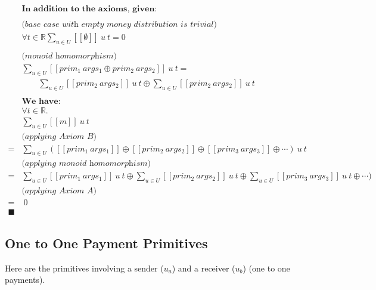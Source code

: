 \begin{equation}
    \begin{split}
        &\textbf{In addition to the axioms, given:} \\
        \\
        &\textit{(base case with empty money distribution is trivial)} \\
        &\forall t \in \mathbb{R} {\displaystyle \sum_{u \in U} [\![\emptyset]\!]\ u\ t = 0} \\
        \\
        &\textit{(monoid homomorphism)} \\
        &{\displaystyle \sum_{u \in U} [\![prim_1\ args_1\oplus prim_2\ args_2]\!]\ u\ t} = \\
        &\qquad {\displaystyle \sum_{u \in U} [\![prim_2\ args_2]\!]\ u\ t} \oplus
          {\displaystyle \sum_{u \in U} [\![prim_2\ args_2]\!]\ u\ t} \\
        \\
        &\textbf{We have:} \\
        &\forall t \in \mathbb{R}. \\
        &{\displaystyle \sum_{u \in U} [\![m]\!]\ u\ t} \\
        &\textit{(applying Axiom B)} \\
        = &{\displaystyle \sum_{u \in U}
            ([\![prim_1\ args_1]\!] \oplus
            [\![prim_2\ args_2]\!] \oplus
            [\![prim_3\ args_3]\!]\oplus \dotsb)
        }\ u\ t\\
        &\textit{(applying monoid homomorphism)} \\
        = &{\displaystyle \sum_{u \in U} [\![prim_1\ args_1]\!]\ u\ t} \oplus
        {\displaystyle \sum_{u \in U} [\![prim_2\ args_2]\!]\ u\ t} \oplus
        {\displaystyle \sum_{u \in U} [\![prim_3\ args_3]\!]\ u\ t} \oplus \dotsb
        )\\
        &\textit{(applying Axiom A)} \\
        =&\ 0
        \\
        \blacksquare
    \end{split}
\end{equation}

\subsection{One to One Payment Primitives}

Here are the primitives involving a sender ($u_a$) and a receiver ($u_b$) (one to one payments).

